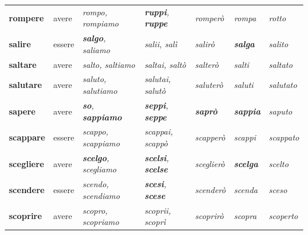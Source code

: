 \documentclass[11pt,a4paper,twoside,openright]{book}
\newcommand{\irr}[1]{{\color{exccol}\bfseries #1}}
\begin{document}
{\begin{xltabular}{\linewidth}{@{}>{\raggedright\arraybackslash}p{2.7cm} l L L l >{\raggedright\arraybackslash}p{1.9cm} l@{}}
\textbf{rompere} & avere & \textit{rompo, rompiamo} & \textit{\irr{ruppi}, \irr{ruppe}} & \textit{romperò} & \textit{rompa} & \textit{rotto} \\
\textbf{salire} & essere & \textit{\irr{salgo}, saliamo} & \textit{salii, salì} & \textit{salirò} & \textit{\irr{salga}} & \textit{salito} \\
\textbf{saltare} & avere & \textit{salto, saltiamo} & \textit{saltai, saltò} & \textit{salterò} & \textit{salti} & \textit{saltato} \\
\textbf{salutare} & avere & \textit{saluto, salutiamo} & \textit{salutai, salutò} & \textit{saluterò} & \textit{saluti} & \textit{salutato} \\
\textbf{sapere} & avere & \textit{\irr{so}, \irr{sappiamo}} & \textit{\irr{seppi}, \irr{seppe}} & \textit{\irr{saprò}} & \textit{\irr{sappia}} & \textit{saputo} \\
\textbf{scappare} & essere & \textit{scappo, scappiamo} & \textit{scappai, scappò} & \textit{scapperò} & \textit{scappi} & \textit{scappato} \\
\textbf{scegliere} & avere & \textit{\irr{scelgo}, scegliamo} & \textit{\irr{scelsi}, \irr{scelse}} & \textit{sceglierò} & \textit{\irr{scelga}} & \textit{scelto} \\
\textbf{scendere} & essere & \textit{scendo, scendiamo} & \textit{\irr{scesi}, \irr{scese}} & \textit{scenderò} & \textit{scenda} & \textit{sceso} \\
\textbf{scoprire} & avere & \textit{scopro, scopriamo} & \textit{scoprii, scoprì} & \textit{scoprirò} & \textit{scopra} & \textit{scoperto} \\

\end{xltabular}}
\end{document}

